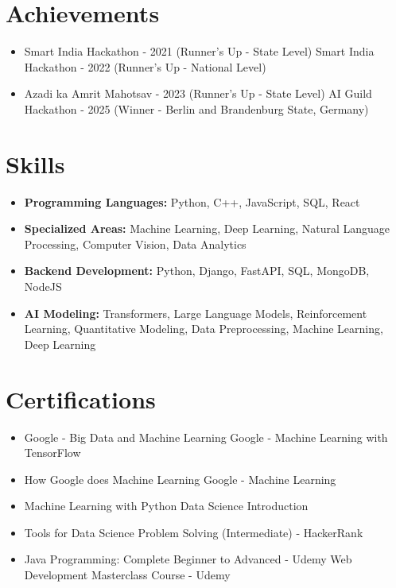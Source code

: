\documentclass[a4paper,10pt]{article}
\begin{document}
\section*{Achievements}
\begin{itemize}
\item Smart India Hackathon - 2021 (Runner's Up - State Level) \hfill Smart India Hackathon - 2022 (Runner's Up - National Level)
\item Azadi ka Amrit Mahotsav - 2023 (Runner's Up - State Level) \hfill AI Guild Hackathon - 2025 (Winner - Berlin and Brandenburg State, Germany)
\end{itemize}

\section*{Skills}
\begin{itemize}
  \item \textbf{Programming Languages:} Python, C++, JavaScript, SQL, React
  \item \textbf{Specialized Areas:} Machine Learning, Deep Learning, Natural Language Processing, Computer Vision, Data Analytics
  \item \textbf{Backend Development:} Python, Django, FastAPI, SQL, MongoDB, NodeJS
  \item \textbf{AI Modeling:} Transformers, Large Language Models, Reinforcement Learning, Quantitative Modeling, Data Preprocessing, Machine Learning, Deep Learning
\end{itemize}

\section*{Certifications}
\begin{itemize}
\item Google - Big Data and Machine Learning \hfill Google - Machine Learning with TensorFlow
\item How Google does Machine Learning \hfill Google - Machine Learning
\item Machine Learning with Python \hfill Data Science Introduction
\item Tools for Data Science \hfill Problem Solving (Intermediate) - HackerRank
\item Java Programming: Complete Beginner to Advanced - Udemy \hfill Web Development Masterclass Course - Udemy
\end{itemize}
\end{document}
